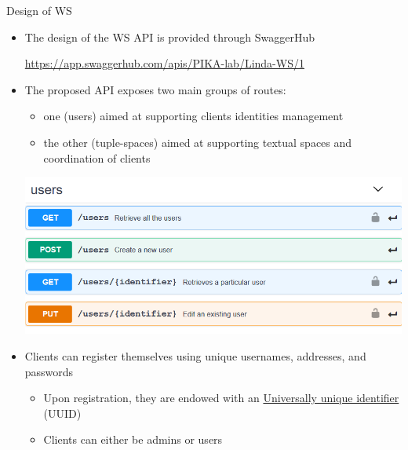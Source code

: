 \documentclass[presentation]{beamer}\mode<presentation>{\usetheme{AMSCesenaPurpleAndGold}}
\begin{document}
\begin{frame}[allowframebreaks]{Design of \linda{} WS}
    \begin{itemize}
        \item The design of the \linda{} WS \alert{API} is provided through SwaggerHub
        \begin{center}
            \url{https://app.swaggerhub.com/apis/PIKA-lab/Linda-WS/1}
        \end{center}
        
        \vspace{.3cm}
        
        \item The proposed API exposes two main groups of routes:
        \begin{itemize}
            \item one (\alert{users}) aimed at supporting clients identities management
            \item the other (\alert{tuple-spaces}) aimed at supporting textual spaces and coordination of clients
        \end{itemize}
        
        \framebreak
        
        \includegraphics[width=\linewidth]{img/ws-api-users.png}
        
        \framebreak
        
        \item Clients can register themselves using unique usernames, addresses, and passwords
        \begin{itemize}
            \item Upon registration, they are endowed with an \href{https://it.wikipedia.org/wiki/Universally_unique_identifier}{Universally unique identifier} (UUID)
            
            \item Clients can either be \alert{admins or users}
            

\end{itemize}
\end{itemize}
\end{frame}
\end{document}
